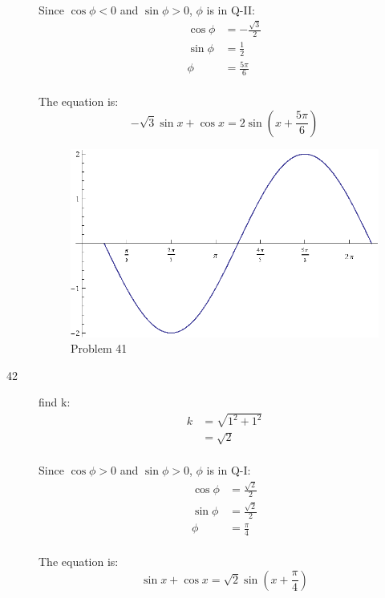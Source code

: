 \documentclass{exam}
\begin{document}
\begin{description}
        Since $\cos \phi < 0$ and $\sin \phi > 0$, $\phi$ is in Q-II:
        \begin{align*}
          \cos \phi & = - \frac{\sqrt{3}}{2} \\
          \sin \phi & = \frac{1}{2} \\
          \phi      & = \frac{5 \pi}{6} \\
        \end{align*}

        The equation is:
        \[
          - \sqrt{3} \sin x + \cos x = \boxed{ 2 \sin \left( x + \frac{5 \pi}{6} \right) } 
        \]

        \begin{figure}[H]
          \centering
          \includegraphics[scale=0.8]{problem41.eps}
          \caption{Problem 41}
        \end{figure}

      \item[42] 
        find k:
        \begin{align*}
          k & = \sqrt{1^2 + 1^2} \\
            & = \sqrt{2} \\
        \end{align*}

        Since $\cos \phi > 0$ and $\sin \phi > 0$, $\phi$ is in Q-I:
        \begin{align*}
          \cos \phi & = \frac{\sqrt{2}}{2} \\
          \sin \phi & = \frac{\sqrt{2}}{2} \\
          \phi      & = \frac{\pi}{4} \\
        \end{align*}

        The equation is:
        \[
          \sin x + \cos x = \boxed{ \sqrt{2} \sin \left( x + \frac{\pi}{4} \right) } 
        \]


\end{description}
\end{document}
